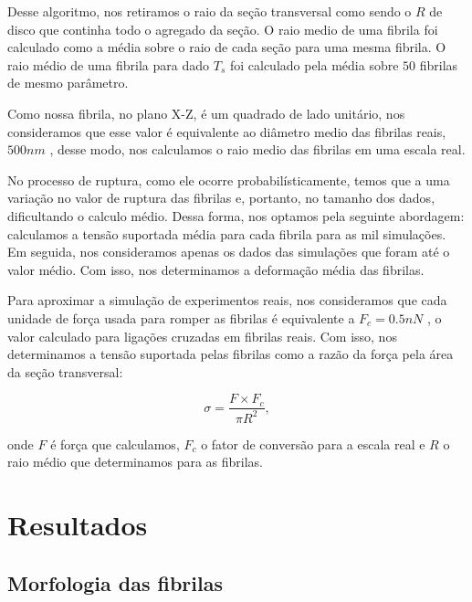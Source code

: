 \documentclass{article}
\begin{document}
        Desse algoritmo, nos retiramos o raio da seção transversal como sendo o \(R\) de disco que continha todo o agregado 
        da seção. O raio medio de uma fibrila foi calculado como a média sobre o raio de cada seção para uma mesma fibrila.
        O raio médio de uma fibrila para dado \(T_{s}\) foi calculado pela média sobre \(50\) fibrilas de mesmo parâmetro.

        Como nossa fibrila, no plano X-Z, é um quadrado de lado unitário, nos consideramos que esse valor é equivalente
        ao diâmetro medio das fibrilas reais, \(500 nm\) \cite{KADLER1996, Parry1984}, desse modo, nos calculamos o raio medio
        das fibrilas em uma escala real.

        No processo de ruptura, como ele ocorre probabilísticamente, temos que a uma variação no valor de ruptura das fibrilas
        e, portanto, no tamanho dos dados, dificultando o calculo médio. Dessa forma, nos optamos pela seguinte abordagem: calculamos
        a tensão suportada média para cada fibrila para as mil simulações. Em seguida, nos consideramos apenas os dados das simulações
        que foram até o valor médio. Com isso, nos determinamos a deformação média das fibrilas. 

        Para aproximar a simulação de experimentos reais, nos consideramos que cada unidade de força usada para romper as fibrilas é
        equivalente a \( F_{c} = 0.5 nN\) \cite{Pandolfi2019AMM}, o valor calculado para ligações cruzadas em fibrilas reais. Com isso, 
        nos determinamos a tensão suportada pelas fibrilas como a razão da força pela área da seção transversal:

        \begin{equation}
            \sigma = \frac{F \times F_{c}}{\pi R^{2}},
        \end{equation}

        \noindent onde \(F\) é força que calculamos,  \( F_{c}\) o fator de conversão para a escala real e \(R\) o raio médio que determinamos
        para as fibrilas.




\section{Resultados}
    \subsection{Morfologia das fibrilas}
\end{document}
